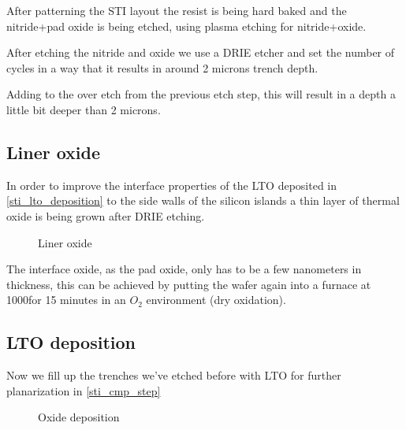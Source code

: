 After patterning the STI layout the resist is being hard baked and the nitride+pad oxide is being etched, using plasma etching for nitride+oxide.

After etching the nitride and oxide we use a DRIE etcher and set the number of cycles in a way that it results in around 2 microns trench depth.

Adding to the over etch from the previous etch step, this will result in a depth a little bit deeper than 2 microns.

\newpage

\subsection{Liner oxide}\label{sti_liner_oxide}

In order to improve the interface properties of the LTO deposited in \autoref{sti_lto_deposition} to the side walls of the silicon islands a thin layer of thermal oxide is being grown after DRIE etching.

\begin{figure}[H]
	\centering
	\begin{tikzpicture}[node distance = 3cm, auto, thick,scale=\CrossSectionOnly, every node/.style={transform shape}]
		
	\end{tikzpicture}
	\drawStepArrow{}
	\begin{tikzpicture}[node distance = 3cm, auto, thick,scale=\CrossSectionOnly, every node/.style={transform shape}]
		
	\end{tikzpicture}
	\caption{Liner oxide}
\end{figure}

The interface oxide, as the pad oxide, only has to be a few nanometers in thickness, this can be achieved by putting the wafer again into a furnace at 1000\degreesC for 15 minutes in an $O_2$ environment (dry oxidation).

\subsection{LTO deposition}\label{sti_lto_deposition}

Now we fill up the trenches we've etched before with LTO for further planarization in \autoref{sti_cmp_step}

\begin{figure}[H]
	\centering
	\begin{tikzpicture}[node distance = 3cm, auto, thick,scale=\CrossSectionOnly, every node/.style={transform shape}]
		
	\end{tikzpicture}
	\begin{tikzpicture}[node distance = 3cm, auto, thick,scale=\CrossSectionOnly, every node/.style={transform shape}]
		
	\end{tikzpicture}
	\caption{Oxide deposition}
\end{figure}

